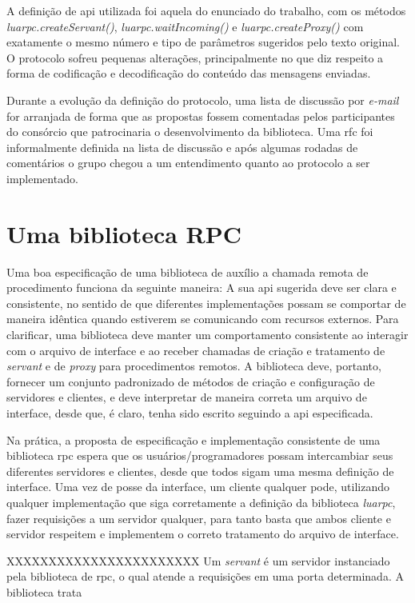\documentclass[11pt]{article}
\begin{document}
A definição de \gls{api} utilizada foi aquela do enunciado do trabalho, com os
métodos \textit{luarpc.createServant()}, \textit{luarpc.waitIncoming()} e
\textit{luarpc.createProxy()} com exatamente o mesmo número e tipo de
parâmetros sugeridos pelo texto original. O protocolo sofreu pequenas
alterações, principalmente no que diz respeito a forma de codificação e
decodificação do conteúdo das mensagens enviadas.

Durante a evolução da definição do protocolo, uma lista de discussão por
\textit{e-mail} for arranjada de forma que as propostas fossem comentadas pelos
participantes do consórcio que patrocinaria o desenvolvimento da biblioteca.
Uma \gls{rfc} foi informalmente definida na lista de discussão e após algumas
rodadas de comentários o grupo chegou a um entendimento quanto ao protocolo a
ser implementado.

\section{Uma biblioteca RPC}\label{sec:rpc}

Uma boa especificação de uma biblioteca de auxílio a chamada remota de
procedimento funciona da seguinte maneira: A sua \gls{api} sugerida deve ser
clara e consistente, no sentido de que diferentes implementações possam se
comportar de maneira idêntica quando estiverem se comunicando com recursos
externos. Para clarificar, uma biblioteca deve manter um comportamento
consistente ao interagir com o arquivo de interface e ao receber chamadas de
criação e tratamento de \textit{servant} e de \textit{proxy} para procedimentos
remotos. A biblioteca deve, portanto, fornecer um conjunto padronizado de
métodos de criação e configuração de servidores e clientes, e deve interpretar
de maneira correta um arquivo de interface, desde que, é claro, tenha sido
escrito seguindo a \gls{api} especificada.

Na prática, a proposta de especificação e implementação consistente de uma
biblioteca \gls{rpc} espera que os usuários/programadores possam intercambiar
seus diferentes servidores e clientes, desde que todos sigam uma mesma
definição de interface. Uma vez de posse da interface, um cliente qualquer
pode, utilizando qualquer implementação que siga corretamente a definição da
biblioteca \textit{luarpc}, fazer requisições a um servidor qualquer, para
tanto basta que ambos cliente e servidor respeitem e implementem o correto
tratamento do arquivo de interface.

XXXXXXXXXXXXXXXXXXXXXXX
Um \textit{servant} é um servidor instanciado pela biblioteca de \gls{rpc}, o qual atende a requisições em uma porta determinada.
A biblioteca trata 
\end{document}
